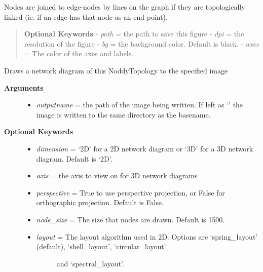 \documentclass[a4paper,10pt,english]{sphinxmanual}
\begin{document}
\begin{fulllineitems}
\begin{fulllineitems}
Nodes are joined to edge-nodes by lines on the graph if they are topologically linked
(ie. if an edge has that node as an end point).
\begin{quote}

\textbf{Optional Keywords}
- \emph{path} = the path to save this figure
- \emph{dpi} = the resolution of the figure
- \emph{bg} = the background color. Default is black.
- \emph{axes} = The color of the axes and labels.
\end{quote}

\end{fulllineitems}


\begin{fulllineitems}
\label{pynoddy:pynoddy.output.NoddyTopology.draw_network_image}
Draws a network diagram of this NoddyTopology to the specified image
\begin{description}
\item[{\textbf{Arguments}}] \leavevmode\begin{itemize}
\item {} 
\emph{outputname} = the path of the image being written. If left as `' the image is written to the same directory as the basename.

\end{itemize}

\item[{\textbf{Optional Keywords}}] \leavevmode\begin{itemize}
\item {} 
\emph{dimension} = `2D' for a 2D network diagram or `3D' for a 3D network diagram. Default is `2D'.

\item {} 
\emph{axis} = the axis to view on for 3D network diagrams

\item {} 
\emph{perspective} = True to use perspective projection, or False for orthographic projection. Default is False.

\item {} 
\emph{node\_size} = The size that nodes are drawn. Default is 1500.

\item {} \begin{description}
\item[{\emph{layout} = The layout algorithm used in 2D. Options are `spring\_layout' (default), `shell\_layout', `circular\_layout' }] \leavevmode
and `spectral\_layout'.


\end{description}
\end{itemize}
\end{description}
\end{fulllineitems}
\end{fulllineitems}
\end{document}
